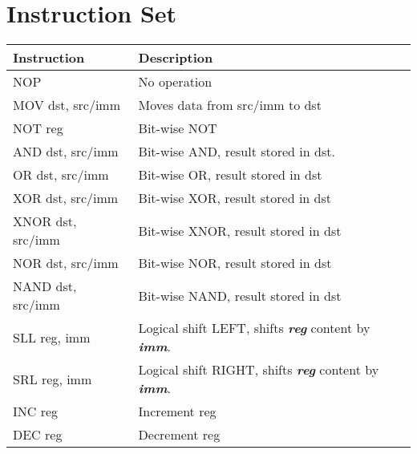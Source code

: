 \documentclass[a4paper, 11pt]{report}
\begin{document}
\section{Instruction Set}
\begin{center}
    \begin{tabular}{|l|p{27em}|}
        \hline
        \textbf{Instruction} & \textbf{Description}                                                                \\
        \hline
        NOP                  & No operation                                                                        \\
        \hline
        MOV dst, src/imm     & Moves data from src/imm to dst                                                      \\
        \hline
        NOT reg              & Bit-wise NOT                                                                        \\
        \hline
        AND dst, src/imm     & Bit-wise AND, result stored in dst.                                                 \\
        \hline
        OR dst, src/imm      & Bit-wise OR, result stored in dst                                                   \\
        \hline
        XOR dst, src/imm     & Bit-wise XOR, result stored in dst                                                  \\
        \hline
        XNOR dst, src/imm    & Bit-wise XNOR, result stored in dst                                                 \\
        \hline
        NOR dst, src/imm     & Bit-wise NOR, result stored in dst                                                  \\
        \hline
        NAND dst, src/imm    & Bit-wise NAND, result stored in dst                                                 \\
        \hline
        SLL reg, imm         & Logical shift LEFT, shifts \textbf{\textit{reg}} content by \textbf{\textit{imm}}.  \\
        \hline
        SRL reg, imm         & Logical shift RIGHT, shifts \textbf{\textit{reg}} content by \textbf{\textit{imm}}. \\
        \hline
        INC reg              & Increment reg                                                                       \\
        \hline
        DEC reg              & Decrement reg                                                                       \\

\end{tabular}
\end{center}
\end{document}
